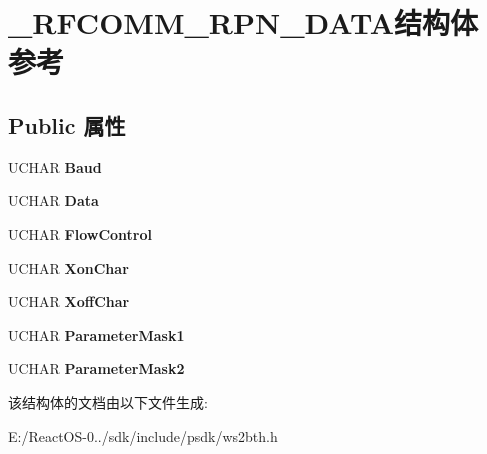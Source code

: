 \hypertarget{struct___r_f_c_o_m_m___r_p_n___d_a_t_a}{}\section{\+\_\+\+R\+F\+C\+O\+M\+M\+\_\+\+R\+P\+N\+\_\+\+D\+A\+T\+A结构体 参考}
\label{struct___r_f_c_o_m_m___r_p_n___d_a_t_a}
\subsection*{Public 属性}
\begin{DoxyCompactItemize}
\item 
\mbox{\label{struct___r_f_c_o_m_m___r_p_n___d_a_t_a_a35060e7c918f3d2755123862a9557345}} 
U\+C\+H\+AR {\bfseries Baud}
\item 
\mbox{\label{struct___r_f_c_o_m_m___r_p_n___d_a_t_a_a7d36182d9a1352dd660a1622dda4a94e}} 
U\+C\+H\+AR {\bfseries Data}
\item 
\mbox{\label{struct___r_f_c_o_m_m___r_p_n___d_a_t_a_aad96a2bfd80742971df09c9ad0cb945d}} 
U\+C\+H\+AR {\bfseries Flow\+Control}
\item 
\mbox{\label{struct___r_f_c_o_m_m___r_p_n___d_a_t_a_a1beb87145b9eb6a740c842ac301e5dda}} 
U\+C\+H\+AR {\bfseries Xon\+Char}
\item 
\mbox{\label{struct___r_f_c_o_m_m___r_p_n___d_a_t_a_ad85230ddf088addb017e41b70cb46e3b}} 
U\+C\+H\+AR {\bfseries Xoff\+Char}
\item 
\mbox{\label{struct___r_f_c_o_m_m___r_p_n___d_a_t_a_a8a6f4480847ce65b8ed7d4d2dce277ba}} 
U\+C\+H\+AR {\bfseries Parameter\+Mask1}
\item 
\mbox{\label{struct___r_f_c_o_m_m___r_p_n___d_a_t_a_aa45bcd7abaf2fe48331878ab20d85460}} 
U\+C\+H\+AR {\bfseries Parameter\+Mask2}
\end{DoxyCompactItemize}


该结构体的文档由以下文件生成\+:\begin{DoxyCompactItemize}
\item 
E\+:/\+React\+O\+S-\/0../sdk/include/psdk/ws2bth.\+h\end{DoxyCompactItemize}
